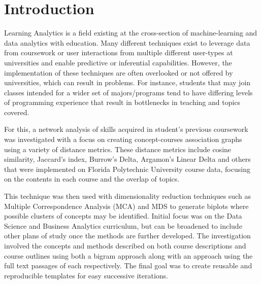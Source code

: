 %
%
%

\chapter{Introduction}
\label{introduction}



\hspace*{0.5cm} Learning Analytics is a field existing at the cross-section of machine-learning and data analytics with education. Many different techniques exist to leverage data from coursework or user interactions from multiple different user-types at universities and enable predictive or inferential capabilities. However, the implementation of these techniques are often overlooked or not offered by universities, which can result in problems. For instance, students that may join classes intended for a wider set of majors/programs tend to have differing levels of programming experience that result in bottlenecks in teaching and topics covered. 

For this, a network analysis of skills acquired in student’s previous coursework was investigated with a focus on creating concept-courses association graphs using a variety of distance metrics.  These distance metrics include cosine similarity,  Jaccard's index, Burrow's Delta, Argamon's Linear Delta and others \cite{lan_tag-aware_2014} \cite{lan_sparse_nodate}  that were implemented on Florida Polytechnic University course data, focusing on the contents in each course and the overlap of topics. 

\indent This technique was then used with dimensionality reduction techniques such as Multiple Correspondence Analysis (MCA) and MDS to generate biplots where possible clusters of concepts may be identified.  Initial focus was on the Data Science and Business Analytics curriculum, but can be broadened to include other plans of study once the methods are further developed. The investigation involved the concepts and methods described on both course descriptions and course outlines using both a bigram approach along with an approach using the full text passages of each respectively.  The final goal was to create reusable and reproducible templates for easy successive iterations. 
